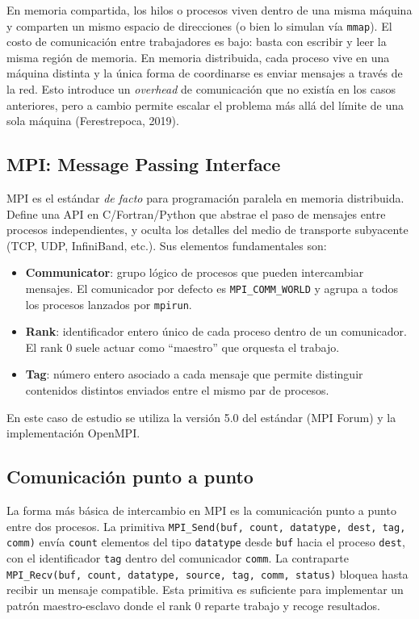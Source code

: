 \documentclass{article}
\begin{document}
En memoria compartida, los hilos o procesos viven dentro de una misma máquina y comparten un mismo espacio de direcciones (o bien lo simulan vía \texttt{mmap}). El costo de comunicación entre trabajadores es bajo: basta con escribir y leer la misma región de memoria. En memoria distribuida, cada proceso vive en una máquina distinta y la única forma de coordinarse es enviar mensajes a través de la red. Esto introduce un \emph{overhead} de comunicación que no existía en los casos anteriores, pero a cambio permite escalar el problema más allá del límite de una sola máquina (Ferestrepoca, 2019)\cite{ferestrepoca}.

\subsection{MPI: Message Passing Interface}

MPI es el estándar \emph{de facto} para programación paralela en memoria distribuida. Define una API en C/Fortran/Python que abstrae el paso de mensajes entre procesos independientes, y oculta los detalles del medio de transporte subyacente (TCP, UDP, InfiniBand, etc.). Sus elementos fundamentales son:

\begin{itemize}
    \item \textbf{Communicator}: grupo lógico de procesos que pueden intercambiar mensajes. El comunicador por defecto es \texttt{MPI\_COMM\_WORLD} y agrupa a todos los procesos lanzados por \texttt{mpirun}.
    \item \textbf{Rank}: identificador entero único de cada proceso dentro de un comunicador. El rank 0 suele actuar como ``maestro'' que orquesta el trabajo.
    \item \textbf{Tag}: número entero asociado a cada mensaje que permite distinguir contenidos distintos enviados entre el mismo par de procesos.
\end{itemize}

En este caso de estudio se utiliza la versión 5.0 del estándar (MPI Forum)\cite{mpiforum} y la implementación OpenMPI\cite{openmpi}.

\subsection{Comunicación punto a punto}

La forma más básica de intercambio en MPI es la comunicación punto a punto entre dos procesos. La primitiva \texttt{MPI\_Send(buf, count, datatype, dest, tag, comm)} envía \texttt{count} elementos del tipo \texttt{datatype} desde \texttt{buf} hacia el proceso \texttt{dest}, con el identificador \texttt{tag} dentro del comunicador \texttt{comm}. La contraparte \texttt{MPI\_Recv(buf, count, datatype, source, tag, comm, status)} bloquea hasta recibir un mensaje compatible. Esta primitiva es suficiente para implementar un patrón maestro-esclavo donde el rank 0 reparte trabajo y recoge resultados.
\end{document}
